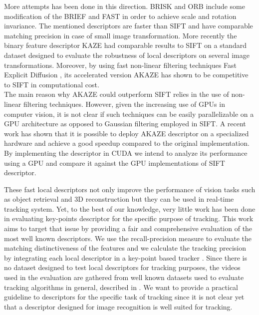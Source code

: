 \documentclass[letterpaper, 10pt, conference]{ieeeconf}
\begin{document}
More attempts has been done in this direction. BRISK \cite{leutenegger11} and ORB \cite{rublee11} include some modification of the BRIEF and FAST in order to achieve scale and rotation invariance. The mentioned descriptors are faster than SIFT and have comparable matching precision in case of small image transformation. More recently the binary feature descriptor KAZE \cite{alcantarilla12} had comparable results to SIFT on a standard dataset \cite{mikolajczyk05} designed to evaluate the robustness of local descriptors on several image transformations. Moreover, by using fast non-linear filtering techniques Fast Explicit Diffusion \cite{goesele2010}, its accelerated version AKAZE \cite{alcantarilla13} has shown to be competitive to SIFT in computational cost.\\
The main reason why AKAZE could outperform SIFT relies in the use of non-linear filtering techniques. However, given the increasing use of GPUs in computer vision, it is not clear if such techniques can be easily parallelizable on a GPU architecture as opposed to Gaussian filtering employed in SIFT. A recent work \cite{jiang2015} has shown that it is possible to deploy AKAZE descriptor on a specialized hardware and achieve a good speedup compared to the original implementation. By implementing the descriptor in CUDA we intend to analyze its performance using a GPU and compare it against the GPU implementations of SIFT descriptor.


These fast local descriptors not only improve the performance of vision tasks such as object retrieval and 3D reconstruction but they can be used in real-time tracking system. Yet, to the best of our knowledge, very little work has been done in evaluating key-points descriptor for the specific purpose of tracking. This work aims to target that issue by providing a fair and comprehensive evaluation of the most well known descriptors. We use the recall-precision measure to evaluate the matching distinctiveness of the features and we calculate the tracking precision by integrating each local descriptor in a key-point based tracker \cite{pieropan15}. Since there is no dataset designed to test local descriptors for tracking purposes, the videos used in the evaluation are gathered from well known datasets used to evaluate tracking algorithms in general, described in \cite{wu2013,nebehay2014,hare2011}. We want to provide a practical guideline to descriptors for the specific task of tracking since it is not clear yet that a descriptor designed for image recognition is well suited for tracking.
 
\end{document}
